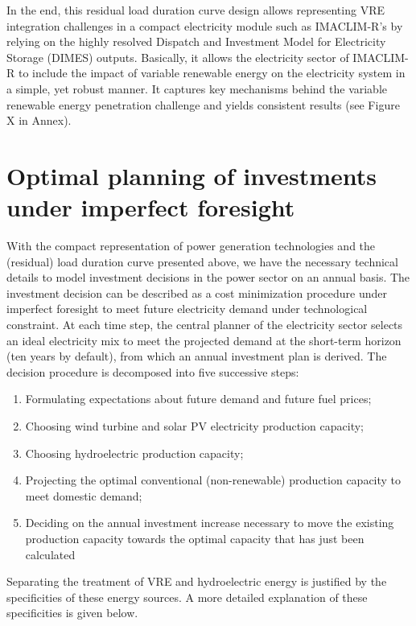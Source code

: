 In the end, this residual load duration curve design allows representing VRE integration challenges in a compact electricity module such as IMACLIM-R's by relying on the highly resolved Dispatch and Investment Model for Electricity Storage (DIMES)  outputs. Basically, it allows the electricity sector of IMACLIM-R to include the impact of variable renewable energy on the electricity system in a simple, yet robust manner. It captures key mechanisms behind the variable renewable energy penetration challenge and yields consistent results (see Figure X in Annex).



\section{Optimal planning of investments under imperfect foresight}

With the compact representation of power generation technologies and the (residual) load duration curve presented above, we have the necessary technical details to model investment decisions in the power sector on an annual basis.
The investment decision can be described as a cost minimization procedure under imperfect foresight to meet future electricity demand under technological constraint. At each time step, the central planner of the electricity sector selects an ideal electricity mix to meet the projected demand at the short-term horizon (ten years by default), from which an annual investment plan is derived.
The decision procedure is decomposed into five successive steps:
\begin{enumerate}
    \item Formulating expectations about future demand and future fuel prices;
    \item Choosing  wind turbine and solar PV  electricity production capacity;
    \item Choosing hydroelectric production capacity;
    \item Projecting the optimal conventional (non-renewable) production capacity to meet domestic demand;
    \item Deciding on the annual investment increase necessary to move the existing production capacity towards the optimal capacity that has just been calculated
\end{enumerate}

Separating the treatment of VRE and hydroelectric energy is justified by the specificities of these energy sources. A more detailed explanation of these specificities is given below.

